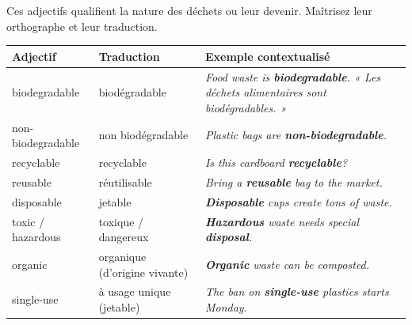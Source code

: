 \documentclass[11pt]{article}
\newcommand{\cle}[1]{{\popxbold\color{popdark}#1}}
\newcommand{\eng}[1]{\ifmmode\text{\textit{#1}}\else\begingroup\selectlanguage{english}\itshape #1\endgroup\fi}
\begin{document}
\begin{propriete}
Ces adjectifs qualifient la nature des déchets ou leur devenir. Maîtrisez leur orthographe et leur traduction.

\begin{center}
\begin{tabularx}{\linewidth}{|X|X|X|}
\hline
\rowcolor{popblueL} \textbf{Adjectif} & \textbf{Traduction} & \textbf{Exemple contextualisé} \\
\hline
\cle{biodegradable} & biodégradable & \eng{Food waste is \textbf{biodegradable}.} « Les déchets alimentaires sont biodégradables. » \\
\hline
\cle{non-biodegradable} & non biodégradable & \eng{Plastic bags are \textbf{non-biodegradable}.} \\
\hline
\cle{recyclable} & recyclable & \eng{Is this cardboard \textbf{recyclable}?} \\
\hline
\cle{reusable} & réutilisable & \eng{Bring a \textbf{reusable} bag to the market.} \\
\hline
\cle{disposable} & jetable & \eng{\textbf{Disposable} cups create tons of waste.} \\
\hline
\cle{toxic} / \cle{hazardous} & toxique / dangereux & \eng{\textbf{Hazardous} waste needs special \textbf{disposal}.} \\
\hline
\cle{organic} & organique (d'origine vivante) & \eng{\textbf{Organic} waste can be composted.} \\
\hline
\cle{single-use} & à usage unique (jetable) & \eng{The ban on \textbf{single-use} plastics starts Monday.} \\
\hline
\end{tabularx}
\end{center}
\end{propriete}
\end{document}
